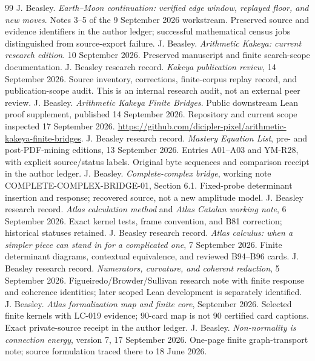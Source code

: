 \documentclass[11pt,letterpaper]{article}
\theoremstyle{definition}
\theoremstyle{remark}\newtheorem{remark}[theorem]{Remark}
\begin{document}
\begin{thebibliography}{99}
 J. Beasley. \emph{Earth--Moon continuation: verified edge window, replayed floor, and new moves}. Notes 3--5 of the 9 September 2026 workstream. Preserved source and evidence identifiers in the author ledger; successful mathematical census jobs distinguished from source-export failure.
 J. Beasley. \emph{Arithmetic Kakeya: current research edition}. 10 September 2026. Preserved manuscript and finite search-scope documentation.
 J. Beasley research record. \emph{Kakeya publication review}, 14 September 2026. Source inventory, corrections, finite-corpus replay record, and publication-scope audit. This is an internal research audit, not an external peer review.
 J. Beasley. \emph{Arithmetic Kakeya Finite Bridges}. Public downstream Lean proof supplement, published 14 September 2026. Repository and current scope inspected 17 September 2026. \url{https://github.com/dicipler-pixel/arithmetic-kakeya-finite-bridges}.
 J. Beasley research record. \emph{Mastery Equation List}, pre- and post-PDF-mining editions, 13 September 2026. Entries A01--A03 and YM-R28, with explicit source/status labels. Original byte sequences and comparison receipt in the author ledger.
 J. Beasley. \emph{Complete-complex bridge}, working note COMPLETE-COMPLEX-BRIDGE-01, Section 6.1. Fixed-probe determinant insertion and response; recovered source, not a new amplitude model.
 J. Beasley research record. \emph{Atlas calculation method} and \emph{Atlas Catalan working note}, 6 September 2026. Exact kernel tests, frame convention, and B81 correction; historical statuses retained.
 J. Beasley research record. \emph{Atlas calculus: when a simpler piece can stand in for a complicated one}, 7 September 2026. Finite determinant diagrams, contextual equivalence, and reviewed B94--B96 cards.
 J. Beasley research record. \emph{Numerators, curvature, and coherent reduction}, 5 September 2026. Figueiredo/Browder/Sullivan research note with finite response and coherence identities; later scoped Lean development is separately identified.
 J. Beasley. \emph{Atlas formalization map and finite core}, September 2026. Selected finite kernels with LC-019 evidence; 90-card map is not 90 certified card captions. Exact private-source receipt in the author ledger.
 J. Beasley. \emph{Non-normality is connection energy}, version 7, 17 September 2026. One-page finite graph-transport note; source formulation traced there to 18 June 2026.

\end{thebibliography}
\end{document}

